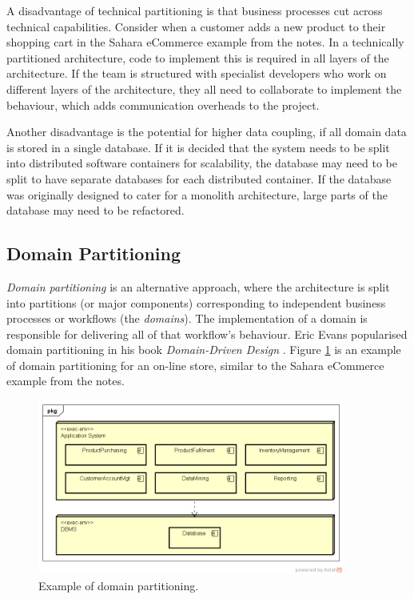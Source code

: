 \clearpage
A disadvantage of technical partitioning is that business processes cut across technical capabilities.
Consider when a customer adds a new product to their shopping cart in the Sahara eCommerce example
from the  notes.
In a technically partitioned architecture, code to implement this is required in all layers of the architecture.
If the team is structured with specialist developers who work on different layers of the architecture,
they all need to collaborate to implement the behaviour, which adds communication overheads to the project.

Another disadvantage is the potential for higher data coupling, if all domain data is stored in a single database.
If it is decided that the system needs to be split into distributed software containers for scalability,
the database may need to be split to have separate databases for each distributed container.
If the database was originally designed to cater for a monolith architecture, large parts of the database may need to be refactored.

\subsection{Domain Partitioning}
\emph{Domain partitioning} is an alternative approach, where the architecture is split into partitions (or major components)
corresponding to independent business processes or workflows (the \emph{domains}).
The implementation of a domain is responsible for delivering all of that workflow's behaviour.
Eric Evans popularised domain partitioning in his book \textit{Domain-Driven Design} \cite{ddd-evans}.
Figure \ref{fig:domain-partitioning} is an example of domain partitioning for an on-line store, similar to the
Sahara eCommerce example from the  notes.

\begin{figure}[h!]
    \centering
    \includegraphics[trim=38 42 19 44,clip,width=0.9\textwidth]{diagrams/domain-partitioning.png}
    \caption{Example of domain partitioning.}
    \label{fig:domain-partitioning}
\end{figure}

